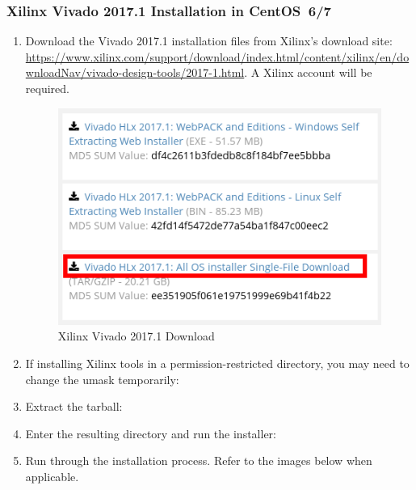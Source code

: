 \begin{flushleft}
\begin{flushleft}
\subsubsection{Xilinx Vivado 2017.1 Installation in CentOS~6/7}
\label{sec:viv}
\begin{enumerate}
\item Download the Vivado 2017.1 installation files from Xilinx's download site:
\url{https://www.xilinx.com/support/download/index.html/content/xilinx/en/downloadNav/vivado-design-tools/2017-1.html}. A Xilinx account will be required.
\begin{figure}[ht]
	\centerline{\includegraphics[scale=0.6]{figures/xilinx_vivado_2017_download}}
	\caption{Xilinx Vivado 2017.1 Download}
\end{figure}
\item If installing Xilinx tools in a permission-restricted directory, you may need to change the umask temporarily:\newline
{}\newline
{}
\item Extract the tarball:\newline
{}
\item Enter the resulting directory and run the installer:\newline
{}\newline
{}\newline
\pagebreak
\item Run through the installation process. Refer to the images below when applicable.
\begin{figure}[H]

\end{figure}
\end{enumerate}
\end{flushleft}
\end{flushleft}

